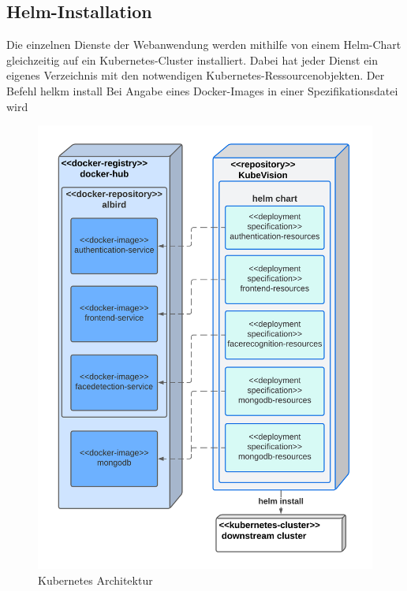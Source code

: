 \subsection{Helm-Installation}

Die einzelnen Dienste der Webanwendung werden mithilfe von einem Helm-Chart gleichzeitig auf ein Kubernetes-Cluster installiert.
Dabei hat jeder Dienst ein eigenes Verzeichnis mit den notwendigen Kubernetes-Ressourcenobjekten.
Der Befehl helkm install 
Bei Angabe eines Docker-Images in einer Spezifikationsdatei wird

\begin{figure}[!htb]
    \centering
    \includegraphics[width=0.8\columnwidth]{images/HelmDeployment.png}
    \caption{Kubernetes Architektur}
    \label{fig:HelmInstallation}
\end{figure}





